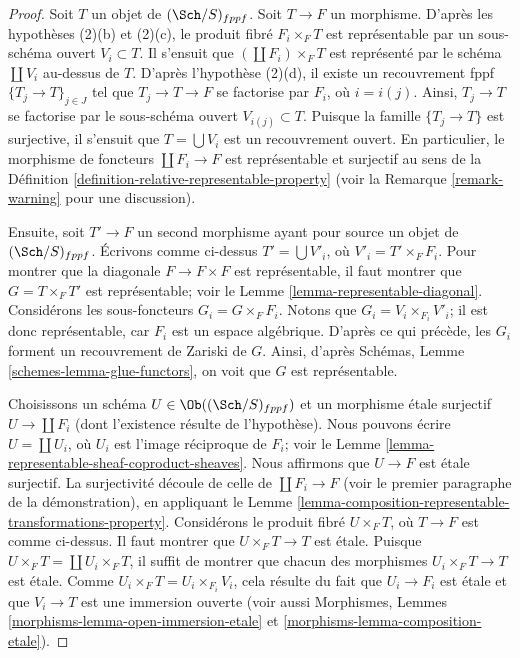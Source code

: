 \begin{proof}
Soit $T$ un objet de $(\Sch/S)_{fppf}$. Soit $T \to F$ un morphisme.
D'après les hypothèses (2)(b) et (2)(c), le produit fibré $F_i \times_F T$
est représentable par un sous-schéma ouvert $V_i \subset T$. Il s'ensuit que
$(\coprod F_i) \times_F T$ est représenté par le schéma $\coprod V_i$ au-dessus de $T$.
D'après l'hypothèse (2)(d), il existe un recouvrement fppf $\{T_j \to T\}_{j \in J}$
tel que $T_j \to T \to F$ se factorise par $F_i$, où $i = i(j)$.
Ainsi, $T_j \to T$ se factorise par le sous-schéma ouvert $V_{i(j)} \subset T$.
Puisque la famille $\{T_j \to T\}$ est surjective, il s'ensuit que
$T = \bigcup V_i$ est un recouvrement ouvert. En particulier, le morphisme
de foncteurs $\coprod F_i \to F$ est représentable
et surjectif au sens de la
Définition \ref{definition-relative-representable-property}
(voir la Remarque \ref{remark-warning} pour une discussion).

\medskip\noindent
Ensuite, soit $T' \to F$ un second morphisme ayant pour source un objet de $(\Sch/S)_{fppf}$.
Écrivons comme ci-dessus $T' = \bigcup V'_i$, où $V'_i = T' \times_F F_i$.
Pour montrer que la diagonale $F \to F \times F$ est représentable,
il faut montrer que $G = T \times_F T'$ est représentable; voir le
Lemme \ref{lemma-representable-diagonal}.
Considérons les sous-foncteurs $G_i = G \times_F F_i$.
Notons que $G_i = V_i \times_{F_i} V'_i$; il est donc représentable,
car $F_i$ est un espace algébrique.
D'après ce qui précède, les $G_i$ forment un recouvrement de Zariski de $G$.
Ainsi, d'après Schémas, Lemme \ref{schemes-lemma-glue-functors},
on voit que $G$ est représentable.

\medskip\noindent
Choisissons un schéma $U \in \Ob((\Sch/S)_{fppf})$ et un morphisme
\'etale surjectif $U \to \coprod F_i$ (dont l'existence résulte de l'hypothèse).
Nous pouvons écrire $U = \coprod U_i$, où $U_i$ est l'image réciproque de $F_i$;
voir le Lemme \ref{lemma-representable-sheaf-coproduct-sheaves}.
Nous affirmons que $U \to F$ est \'etale surjectif. La surjectivité découle
de celle de $\coprod F_i \to F$ (voir le premier paragraphe de la démonstration),
en appliquant le
Lemme \ref{lemma-composition-representable-transformations-property}.
Considérons le produit fibré $U \times_F T$, où $T \to F$ est comme
ci-dessus. Il faut montrer que $U \times_F T \to T$ est \'etale.
Puisque $U \times_F T = \coprod U_i \times_F T$, il suffit de montrer que
chacun des morphismes $U_i \times_F T \to T$ est \'etale. Comme
$U_i \times_F T = U_i \times_{F_i} V_i$, cela résulte du
fait que $U_i \to F_i$ est \'etale et que $V_i \to T$ est une immersion ouverte
(voir aussi Morphismes, Lemmes \ref{morphisms-lemma-open-immersion-etale}
et \ref{morphisms-lemma-composition-etale}).
\end{proof}














